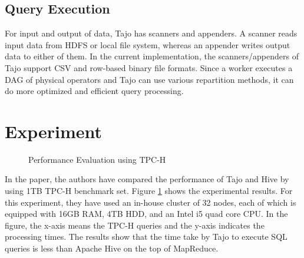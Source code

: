 \documentclass[9pt,twocolumn,twoside]{styles/osajnl}
\begin{document}
\subsection{Query Execution}
\cite{tajo-paper} For input and output of data, Tajo has scanners and
appenders. A scanner reads input data from HDFS or local file system,
whereas an appender writes output data to either of them. In the
current implementation, the scanners/appenders of Tajo support CSV and
row-based binary file formats. Since a worker executes a DAG of
physical operators and Tajo can use various repartition methods, it
can do more optimized and efficient query processing.

\section{Experiment}


\begin{figure}[htbp]
\centering
{}
\caption{\cite{tajo-paper} Performance Evaluation using TPC-H}
\label{fig:experiments}
\end{figure}

\noindent
In the \cite{tajo-paper} paper, the authors have compared the performance of
Tajo and Hive by using 1TB TPC-H benchmark set. Figure
\ref{fig:experiments} shows the experimental results. For this
experiment, they have used an in-house cluster of 32 nodes, each of
which is equipped with 16GB RAM, 4TB HDD, and an Intel i5 quad core
CPU. In the figure, the x-axis means the TPC-H queries and the y-axis
indicates the processing times. The results show that the time take by
Tajo to execute SQL queries is less than Apache Hive on the top of
MapReduce.
\end{document}
